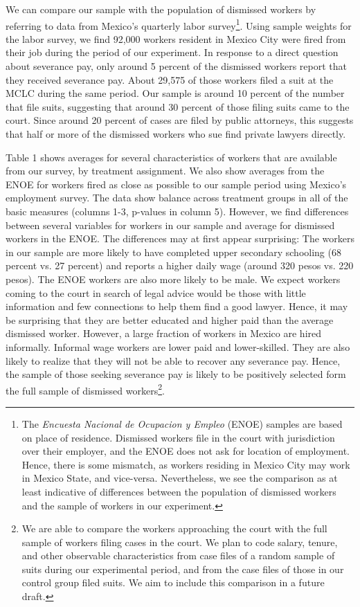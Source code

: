 \documentclass[oneside,12pt]{article}
\begin{document}
We can compare our sample with the population of dismissed workers by referring to data from Mexico’s quarterly labor survey\footnote{The \emph{Encuesta Nacional de Ocupacion y Empleo} (ENOE) samples are based on place of residence. Dismissed workers file in the court with jurisdiction over their employer, and the ENOE does not ask for location of employment. Hence, there is some mismatch, as workers residing in Mexico City may work in Mexico State, and vice-versa. Nevertheless, we see the comparison as at least indicative of differences between the population of dismissed workers and the sample of workers in our experiment. }.  Using sample weights for the labor survey, we find 92,000 workers resident in Mexico City were fired from their job during the period of our experiment. In response to a direct question about severance pay, only around 5 percent of the dismissed workers report that they received severance pay. About 29,575 of those workers filed a suit at the MCLC during the same period. Our sample is around 10 percent of the number that file suits, suggesting that around 30 percent of those filing suits came to the court. Since around 20 percent of cases are filed by public attorneys, this suggests that half or more of the dismissed workers who sue find private lawyers directly. 

Table 1 shows averages for several characteristics of workers that are available from our survey, by treatment assignment. We also show averages from the ENOE for workers fired as close as possible to our sample period using Mexico’s employment survey. The data show balance across treatment groups in all of the basic measures (columns 1-3, p-values in column 5). However, we find differences between several variables for workers in our sample and average for dismissed workers in the ENOE. The differences may at first appear surprising: The workers in our sample are more likely to have completed upper secondary schooling (68 percent vs. 27 percent) and reports a higher daily wage (around 320 pesos vs. 220 pesos). The ENOE workers are also more likely to be male. We expect workers coming to the court in search of legal advice would be those with little information and few connections to help them find a good lawyer. Hence, it may be surprising that they are better educated and higher paid than the average dismissed worker. However, a large fraction of workers in Mexico are hired informally. Informal wage workers are lower paid and lower-skilled. They are also likely to realize that they will not be able to recover any severance pay. Hence, the sample of those seeking severance pay is likely to be positively selected form the full sample of dismissed workers\footnote{We are able to compare the workers approaching the court with the full sample of workers filing cases in the court. We plan to code salary, tenure, and other observable characteristics from case files of a random sample of suits during our experimental period, and from the case files of those in our control group filed suits. We aim to include this comparison in a future draft. }.  
\end{document}
